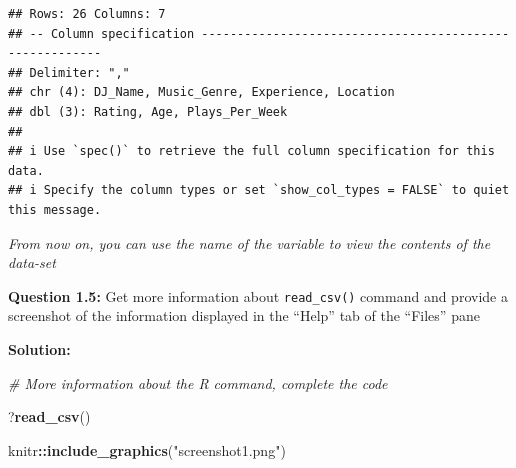 \documentclass[
]{article}
\newenvironment{Shaded}{\begin{snugshade}}{\end{snugshade}}
\newcommand{\CommentTok}[1]{\textcolor[rgb]{0.56,0.35,0.01}{\textit{#1}}}
\newcommand{\FunctionTok}[1]{\textcolor[rgb]{0.13,0.29,0.53}{\textbf{#1}}}
\newcommand{\NormalTok}[1]{#1}
\newcommand{\SpecialCharTok}[1]{\textcolor[rgb]{0.81,0.36,0.00}{\textbf{#1}}}
\newcommand{\StringTok}[1]{\textcolor[rgb]{0.31,0.60,0.02}{#1}}
\begin{document}
\begin{verbatim}
## Rows: 26 Columns: 7
## -- Column specification --------------------------------------------------------
## Delimiter: ","
## chr (4): DJ_Name, Music_Genre, Experience, Location
## dbl (3): Rating, Age, Plays_Per_Week
## 
## i Use `spec()` to retrieve the full column specification for this data.
## i Specify the column types or set `show_col_types = FALSE` to quiet this message.
\end{verbatim}

\emph{From now on, you can use the name of the variable to view the
contents of the data-set}

\textbf{Question 1.5:} Get more information about \texttt{read\_csv()}
command and provide a screenshot of the information displayed in the
``Help'' tab of the ``Files'' pane

\textbf{Solution:}

\begin{Shaded}
\begin{Highlighting}[]
\CommentTok{\# More information about the R command, complete the code}

\NormalTok{?}\FunctionTok{read\_csv}\NormalTok{()}
\end{Highlighting}
\end{Shaded}

\begin{Shaded}
\begin{Highlighting}[]
\NormalTok{knitr}\SpecialCharTok{::}\FunctionTok{include\_graphics}\NormalTok{(}\StringTok{"screenshot1.png"}\NormalTok{)}
\end{Highlighting}
\end{Shaded}
\end{document}
